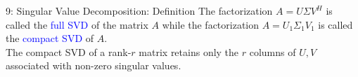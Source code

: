 \documentclass[10pt,english,aspectratio=169]{beamer}
\begin{document}
\begin{frame}{9: Singular Value Decomposition: Definition}
The factorization $A = U \Sigma V^H$ is called the \textcolor{blue}{full SVD} of the matrix $A$ while the factorization $A = U_1 \Sigma_1 V_1$ is called the \textcolor{blue}{compact SVD} of $A$.
\\[1mm] The compact SVD of a rank-$r$ matrix retains only the $r$ columns of $U,V$ associated with non-zero singular values.

\end{frame}
\end{document}
